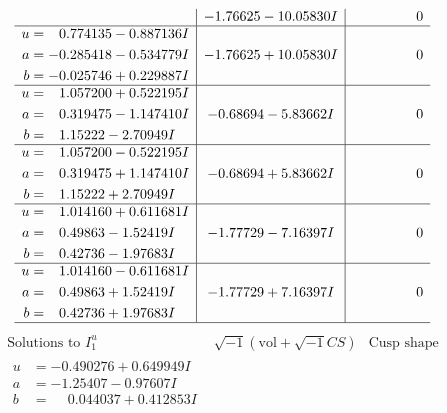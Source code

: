 \documentclass[1p]{elsarticle_modified}
\theoremstyle{definition}
\newcommand{\I}{\sqrt{-1}}
\begin{document}
$$\begin{array}{c|c|c}
 & -1.76625 - 10.05830 I & \phantom{-0.000000 } 0 \\ \hline\begin{aligned}
u &= \phantom{-}0.774135 - 0.887136 I \\
a &= -0.285418 - 0.534779 I \\
b &= -0.025746 + 0.229887 I\end{aligned}
 & -1.76625 + 10.05830 I & \phantom{-0.000000 } 0 \\ \hline\begin{aligned}
u &= \phantom{-}1.057200 + 0.522195 I \\
a &= \phantom{-}0.319475 - 1.147410 I \\
b &= \phantom{-}1.15222 - 2.70949 I\end{aligned}
 & -0.68694 - 5.83662 I & \phantom{-0.000000 } 0 \\ \hline\begin{aligned}
u &= \phantom{-}1.057200 - 0.522195 I \\
a &= \phantom{-}0.319475 + 1.147410 I \\
b &= \phantom{-}1.15222 + 2.70949 I\end{aligned}
 & -0.68694 + 5.83662 I & \phantom{-0.000000 } 0 \\ \hline\begin{aligned}
u &= \phantom{-}1.014160 + 0.611681 I \\
a &= \phantom{-}0.49863 - 1.52419 I \\
b &= \phantom{-}0.42736 - 1.97683 I\end{aligned}
 & -1.77729 - 7.16397 I & \phantom{-0.000000 } 0 \\ \hline\begin{aligned}
u &= \phantom{-}1.014160 - 0.611681 I \\
a &= \phantom{-}0.49863 + 1.52419 I \\
b &= \phantom{-}0.42736 + 1.97683 I\end{aligned}
 & -1.77729 + 7.16397 I & \phantom{-0.000000 } 0\\
 \hline 
 \end{array}$$\newpage$$\begin{array}{c|c|c}  
\text{Solutions to }I^u_{1}& \I (\text{vol} + \sqrt{-1}CS) & \text{Cusp shape}\\
 \hline 
\begin{aligned}
u &= -0.490276 + 0.649949 I \\
a &= -1.25407 - 0.97607 I \\
b &= \phantom{-}0.044037 + 0.412853 I\end{aligned}

\end{array}$$
\end{document}
